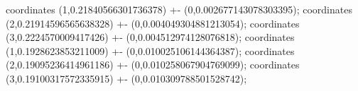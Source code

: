 coordinates {(1,0.21840566301736378) +- (0,0.002677143078303395)};
coordinates {(2,0.21914596565638328) +- (0,0.004049304881213054)};
coordinates {(3,0.2224570009417426) +- (0,0.004512974128076818)};
coordinates {(1,0.1928623853211009) +- (0,0.010025106144364387)};
coordinates {(2,0.19095236414961186) +- (0,0.010258067904769099)};
coordinates {(3,0.19100317572335915) +- (0,0.010309788501528742)};
